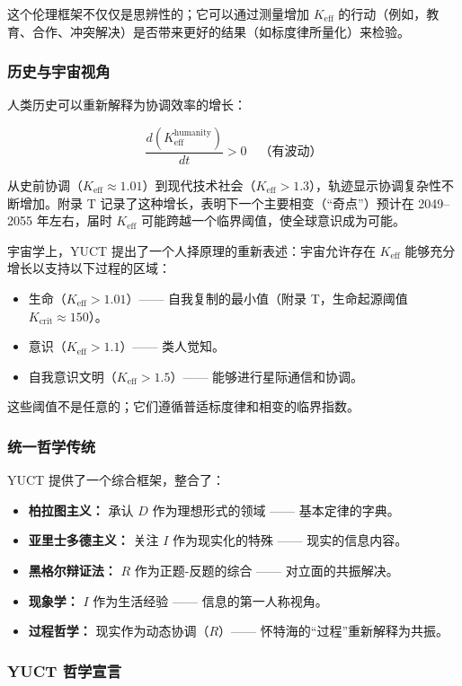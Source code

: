 \documentclass[12pt,a4paper]{article}
\newcommand{\eff}{\mathrm{eff}}
\newcommand{\Ke}{K_{\eff}}
\newcommand{\Kcrit}{K_{\mathrm{crit}}}
\begin{document}
		这个伦理框架不仅仅是思辨性的；它可以通过测量增加 $\Ke$ 的行动（例如，教育、合作、冲突解决）是否带来更好的结果（如标度律所量化）来检验。
		
		\subsubsection{历史与宇宙视角}
		
		人类历史可以重新解释为协调效率的增长：
		
		\[
		\frac{d(\Ke^{\text{humanity}})}{dt} > 0 \quad \text{（有波动）}
		\]
		
		从史前协调（$\Ke \approx 1.01$）到现代技术社会（$\Ke > 1.3$），轨迹显示协调复杂性不断增加。附录 T 记录了这种增长，表明下一个主要相变（“奇点”）预计在 2049–2055 年左右，届时 $\Ke$ 可能跨越一个临界阈值，使全球意识成为可能。
		
		宇宙学上，YUCT 提出了一个人择原理的重新表述：宇宙允许存在 $\Ke$ 能够充分增长以支持以下过程的区域：
		\begin{itemize}
		\item 生命（$\Ke > 1.01$）—— 自我复制的最小值（附录 T，生命起源阈值 $\Kcrit \approx 150$）。
		\item 意识（$\Ke > 1.1$）—— 类人觉知。
		\item 自我意识文明（$\Ke > 1.5$）—— 能够进行星际通信和协调。
		\end{itemize}
		
		这些阈值不是任意的；它们遵循普适标度律和相变的临界指数。
		
		\subsubsection{统一哲学传统}
		
		YUCT 提供了一个综合框架，整合了：
		\begin{itemize}
		\item \textbf{柏拉图主义：} 承认 $D$ 作为理想形式的领域 —— 基本定律的字典。
		\item \textbf{亚里士多德主义：} 关注 $I$ 作为现实化的特殊 —— 现实的信息内容。
		\item \textbf{黑格尔辩证法：} $R$ 作为正题-反题的综合 —— 对立面的共振解决。
		\item \textbf{现象学：} $I$ 作为生活经验 —— 信息的第一人称视角。
		\item \textbf{过程哲学：} 现实作为动态协调（$R$）—— 怀特海的“过程”重新解释为共振。
		\end{itemize}
		
		\subsubsection{YUCT 哲学宣言}
		
\end{document}
